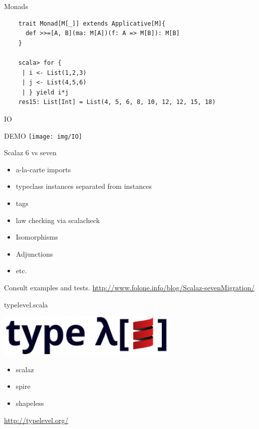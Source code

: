 \documentclass{beamer}
\begin{document}
\begin{frame}[fragile]{Monads}
  \begin{verbatim}
    trait Monad[M[_]] extends Applicative[M]{
      def >>=[A, B](ma: M[A])(f: A => M[B]): M[B]
    }

    scala> for {
     | i <- List(1,2,3)
     | j <- List(4,5,6)
     | } yield i*j
    res15: List[Int] = List(4, 5, 6, 8, 10, 12, 12, 15, 18)
  \end{verbatim}
\end{frame}

\begin{frame}[fragile]{IO}
  \begin{center}
    {\Huge DEMO }\newline
    \texttt{[image: img/IO]}
  \end{center}
\end{frame}

\begin{frame}[fragile]{Scalaz 6 vs seven}
  \begin{center}
    \begin{itemize}
      \item a-la-carte imports
      \item typeclass instances separated from instances
      \item tags
      \item law checking via scalacheck
      \item Isomorphisms
      \item Adjunctions
      \item etc.
    \end{itemize}
  Consult examples and tests.
  \url{http://www.folone.info/blog/Scalaz-sevenMigration/}
  \end{center}
\end{frame}

\begin{frame}[fragile]{typelevel.scala}
  \begin{center}
    \includegraphics[scale=0.5]{img/typelevel}
      \begin{itemize}
        \item scalaz
        \item spire
        \item shapeless
      \end{itemize}
    {\large \url{http://typelevel.org/} }
  \end{center}
\end{frame}
\end{document}
